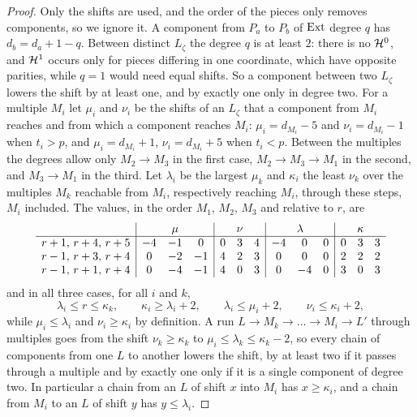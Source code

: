 \begin{proof}
Only the shifts are used, and the order of the pieces only removes
components, so we ignore it. A component from $P_{a}$ to $P_{b}$ of $\operatorname{Ext}$
degree $q$ has $d_{b}=d_{a}+1-q$. Between distinct $L_{\zeta}$ the degree $q$
is at least $2$: there is no $\mathcal{H}^{0}$, and $\mathcal{H}^{1}$ occurs only for pieces
differing in one coordinate, which have opposite parities, while $q=1$ would
need equal shifts. So a component between two $L_{\zeta}$ lowers the shift
by at least one, and by exactly one only in degree two. For a multiple
$M_{i}$ let $\mu_{i}$ and $\nu_{i}$ be the shifts of an $L_{\zeta}$ that a
component from $M_{i}$ reaches and from which a component reaches $M_{i}$:
$\mu_{i}=d_{M_{i}}-5$ and $\nu_{i}=d_{M_{i}}-1$ when $t_{i}>p$, and
$\mu_{i}=d_{M_{i}}+1$, $\nu_{i}=d_{M_{i}}+5$ when $t_{i}<p$. Between the
multiples the degrees allow only $M_{2}\to M_{3}$ in the first case,
$M_{2}\to M_{3}\to M_{1}$ in the second, and $M_{3}\to M_{1}$ in the third.
Let $\lambda_{i}$ be the largest $\mu_{k}$ and $\kappa_{i}$ the least
$\nu_{k}$ over the multiples $M_{k}$ reachable from $M_{i}$, respectively
reaching $M_{i}$, through these steps, $M_{i}$ included. The values, in the
order $M_{1}$, $M_{2}$, $M_{3}$ and relative to $r$, are
\[
\begin{array}{l|ccc|ccc|ccc|ccc}
 & \multicolumn{3}{c|}{\mu} & \multicolumn{3}{c|}{\nu}
 & \multicolumn{3}{c|}{\lambda} & \multicolumn{3}{c}{\kappa}\\
\hline
r+1,\,r+4,\,r+5 & -4&-1&0 & 0&3&4 & -4&0&0 & 0&3&3\\
r-1,\,r+3,\,r+4 & 0&-2&-1 & 4&2&3 & 0&0&0 & 2&2&2\\
r-1,\,r+1,\,r+4 & 0&-4&-1 & 4&0&3 & 0&-4&0 & 3&0&3
\end{array}
\]
and in all three cases, for all $i$ and $k$,
\begin{equation}\label{eq:allthree}
  \lambda_{i}\le r\le\kappa_{k},\qquad
  \kappa_{i}\ge\lambda_{i}+2,\qquad
  \lambda_{i}\le\mu_{i}+2,\qquad
  \nu_{i}\le\kappa_{i}+2,
\end{equation}
while $\mu_{i}\le\lambda_{i}$ and $\nu_{i}\ge\kappa_{i}$ by definition. A
run $L\to M_{k}\to\dots\to M_{i}\to L'$ through multiples goes from the shift
$\nu_{k}\ge\kappa_{k}$ to $\mu_{i}\le\lambda_{k}\le\kappa_{k}-2$, so every chain
of components from one $L$ to another lowers the shift, by at least two if it
passes through a multiple and by exactly one only if it is a single component
of degree two. In particular a chain from an $L$ of shift $x$ into $M_{i}$
has $x\ge\kappa_{i}$, and a chain from $M_{i}$ to an $L$ of shift $y$ has
$y\le\lambda_{i}$.


\end{proof}
